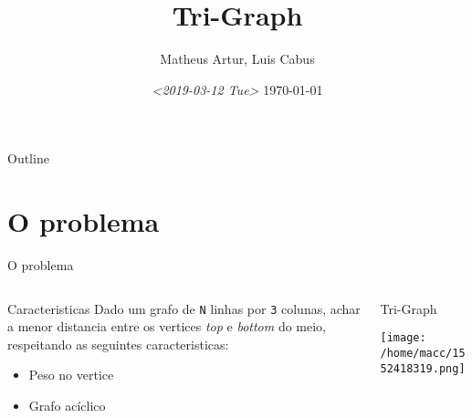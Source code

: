 \documentclass[presentation]{beamer}
\author{Matheus Artur, Luis Cabus}
\date{\textit{<2019-03-12 Tue>} \today}
\title{Tri-Graph}
\begin{document}
\maketitle
\begin{frame}{Outline}
\tableofcontents
\end{frame}


\section{O problema}
\label{sec:org5bed760}
\begin{frame}[fragile,label={sec:org164f4e5}]{O problema}
 \begin{columns}
\begin{column}{0.48\columnwidth}
\begin{block}{Caracteristicas}
    Dado um grafo de \texttt{N} linhas por \texttt{3} colunas, achar a menor distancia 
entre os vertices \emph{top} e \emph{bottom} do meio, respeitando as seguintes caracteristicas:
\begin{itemize}
\item Peso no vertice
\item Grafo acíclico
\end{itemize}
\end{block}
\end{column}

\begin{column}{0.48\columnwidth}
\begin{block}{Tri-Graph}
\begin{center}
\texttt{[image: /home/macc/1552418319.png]}
\label{org1c57383}
\end{center}
\end{block}
\end{column}
\end{columns}
\end{frame}
\end{document}
